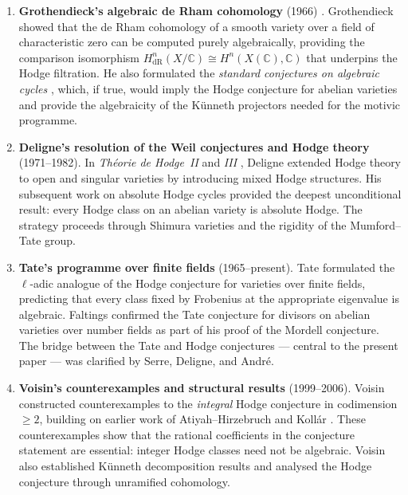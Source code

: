 \documentclass[11pt]{article}
\theoremstyle{definition}
\begin{document}
\begin{enumerate}[label=(\roman*)]
  \item \textbf{Grothendieck's algebraic de Rham cohomology} (1966)
    \cite{Grothendieck-dR}. Grothendieck showed that the de Rham cohomology
    of a smooth variety over a field of characteristic zero can be computed
    purely algebraically, providing the comparison isomorphism
    $H^n_{\mathrm{dR}}(X/\mathbb{C}) \cong H^n(X(\mathbb{C}), \mathbb{C})$
    that underpins the Hodge filtration.  He also formulated the
    \emph{standard conjectures on algebraic cycles} \cite{Grothendieck},
    which, if true, would imply the Hodge conjecture for abelian varieties
    and provide the algebraicity of the K\"unneth projectors needed for
    the motivic programme.

  \item \textbf{Deligne's resolution of the Weil conjectures and Hodge theory}
    (1971--1982).  In \textit{Th\'eorie de Hodge~II} \cite{Deligne-HodgeII}
    and \textit{III} \cite{Deligne-HodgeIII}, Deligne extended Hodge theory
    to open and singular varieties by introducing mixed Hodge structures.
    His subsequent work on absolute Hodge cycles \cite{Deligne} provided the
    deepest unconditional result: every Hodge class on an abelian variety is
    absolute Hodge.  The strategy proceeds through Shimura varieties and the
    rigidity of the Mumford--Tate group.

  \item \textbf{Tate's programme over finite fields} (1965--present).
    Tate \cite{Tate} formulated the $\ell$-adic analogue of the Hodge
    conjecture for varieties over finite fields, predicting that every
    class fixed by Frobenius at the appropriate eigenvalue is algebraic.
    Faltings \cite{Faltings} confirmed the Tate conjecture for divisors on
    abelian varieties over number fields as part of his proof of the Mordell
    conjecture.  The bridge between the Tate and Hodge conjectures --- central
    to the present paper --- was clarified by Serre, Deligne, and Andr\'e.

  \item \textbf{Voisin's counterexamples and structural results}
    (1999--2006).  Voisin \cite{Voisin-integral} constructed counterexamples
    to the \emph{integral} Hodge conjecture in codimension $\geq 2$, building
    on earlier work of Atiyah--Hirzebruch \cite{AH} and Koll\'ar
    \cite{Kollar}.  These counterexamples show that the rational coefficients
    in the conjecture statement are essential: integer Hodge classes need not
    be algebraic.  Voisin also established K\"unneth decomposition results
    and analysed the Hodge conjecture through unramified cohomology.


\end{enumerate}
\end{document}
